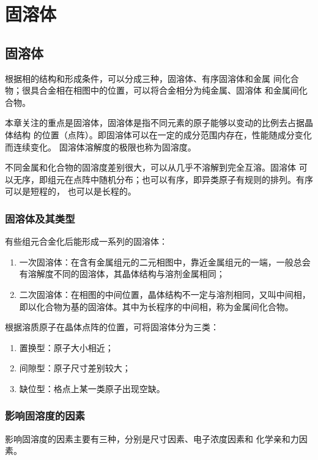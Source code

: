 \chapter{固溶体}
    \section{固溶体}
        根据相的结构和形成条件，可以分成三种，固溶体、有序固溶体和金属
        间化合物；很具合金相在相图中的位置，可以将合金相分为纯金属、固溶体
        和金属间化合物。

        本章关注的重点是固溶体，固溶体是指不同元素的原子能够以变动的比例去占据晶体结构
        的位置（点阵）。即固溶体可以在一定的成分范围内存在，性能随成分变化而连续变化。
        固溶体溶解度的极限也称为固溶度。

        不同金属和化合物的固溶度差别很大，可以从几乎不溶解到完全互溶。固溶体
        可以无序，即组元在点阵中随机分布；也可以有序，即异类原子有规则的排列。有序可以是短程的，
        也可以是长程的。

        \subsection{固溶体及其类型}
            有些组元合金化后能形成一系列的固溶体：
            \begin{enumerate}
                \item 一次固溶体：在含有金属组元的二元相图中，靠近金属组元的一端，一般总会有溶解度不同的固溶体，其晶体结构与溶剂金属相同；
                \item 二次固溶体：在相图的中间位置，晶体结构不一定与溶剂相同，又叫中间相，即以化合物为基的固溶体。其中为长程序的中间相，称为金属间化合物。
            \end{enumerate}

            根据溶质原子在晶体点阵的位置，可将固溶体分为三类：
            \begin{enumerate}
                \item 置换型：原子大小相近；
                \item 间隙型：原子尺寸差别较大；
                \item 缺位型：格点上某一类原子出现空缺。
            \end{enumerate}
        \subsection{影响固溶度的因素}
            影响固溶度的因素主要有三种，分别是尺寸因素、电子浓度因素和
            化学亲和力因素。
